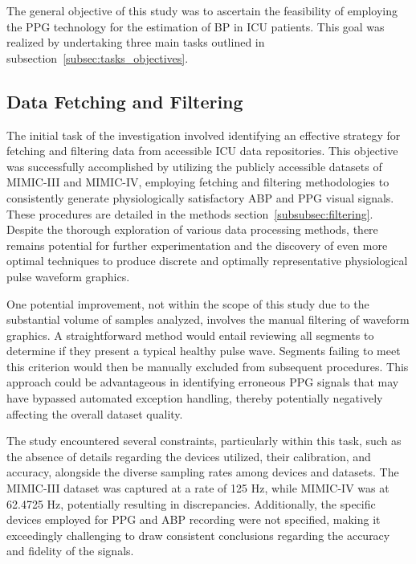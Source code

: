 The general objective of this study was to ascertain the feasibility of employing the PPG technology for the estimation of BP in ICU patients.
This goal was realized by undertaking three main tasks outlined in subsection~\ref{subsec:tasks_objectives}.

\subsection{Data Fetching and Filtering}
\label{subsec:data-fetching-and-filtering}

The initial task of the investigation involved identifying an effective strategy for fetching and filtering data from accessible ICU data repositories.
This objective was successfully accomplished by utilizing the publicly accessible datasets of MIMIC-III and MIMIC-IV,
employing fetching and filtering methodologies to consistently generate physiologically satisfactory ABP and PPG visual signals.
These procedures are detailed in the methods section~\ref{subsubsec:filtering}.
Despite the thorough exploration of various data processing methods, there remains potential for further experimentation and the discovery of even more optimal techniques
to produce discrete and optimally representative physiological pulse waveform graphics.

One potential improvement, not within the scope of this study due to the substantial volume of samples analyzed, involves the manual filtering of waveform graphics.
A straightforward method would entail reviewing all segments to determine if they present a typical healthy pulse wave.
Segments failing to meet this criterion would then be manually excluded from subsequent procedures.
This approach could be advantageous in identifying erroneous PPG signals that may have bypassed automated exception handling, thereby potentially negatively affecting the overall dataset quality.

The study encountered several constraints, particularly within this task, such as the absence of details regarding the devices utilized,
their calibration, and accuracy, alongside the diverse sampling rates among devices and datasets.
The MIMIC-III dataset was captured at a rate of 125 Hz, while MIMIC-IV was at 62.4725 Hz, potentially resulting in discrepancies.
Additionally, the specific devices employed for PPG and ABP recording were not specified, making it exceedingly challenging to draw consistent conclusions regarding the accuracy and fidelity of the signals.


